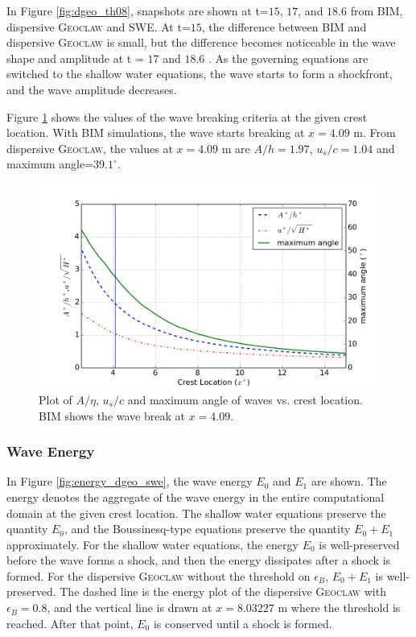 \documentclass[review]{elsarticle}
\begin{document}
In Figure \ref{fig:dgeo_th08}, snapshots are shown at 
t=$15$, $17$, and $18.6$ from BIM, dispersive \textsc{Geoclaw} 
and SWE.
At t=$15$, the difference between BIM and dispersive \textsc{Geoclaw}
is small, but the difference becomes noticeable 
in the wave shape and amplitude at t = $17$ and $18.6$ . 
As the governing equations are switched to the shallow water equations,
the wave starts to form a shockfront, and the wave amplitude decreases.

Figure \ref{fig:wave_break_criteria} shows 
the values of the wave breaking criteria at the given crest location. 
With BIM simulations, the wave starts breaking at $x=4.09$ m. 
From dispersive \textsc{Geoclaw}, the values at $x=4.09$ m are
$A/h=1.97$, $u_s/c=1.04$ and maximum angle=$39.1^\circ$. 

\begin{figure}[!htb]
\centering
\includegraphics[width=.7\textwidth]{_fig/wave_break}
\caption{Plot of $A/\eta$, $u_s/c$ and maximum angle of waves vs. crest location. 
BIM shows the wave break at $x=4.09$. }
\label{fig:wave_break_criteria}
\end{figure}

\subsubsection{Wave Energy}

In Figure \ref{fig:energy_dgeo_swe}, the wave energy $E_0$ and $E_1$ are shown. 
The energy denotes the aggregate 
of the wave energy in the entire computational domain 
at the given crest location.
The shallow water equations preserve the quantity $E_0$,
and the Boussinesq-type equations preserve 
the quantity $E_0+E_1$ approximately.
For the shallow water equations, 
the energy $E_0$ is well-preserved 
before the wave forms a shock,
and then the energy dissipates after a shock is formed. 
For the dispersive \textsc{Geoclaw} without the threshold on $\epsilon_B$,
$E_0+E_1$ is well-preserved. 
The dashed line is the energy plot
of the dispersive \textsc{Geoclaw} with $\epsilon_B=0.8$,
and the vertical line is drawn at $x=8.03227$ m 
where the threshold is reached. 
After that point, $E_0$ is conserved until a shock is formed. 
\end{document}
